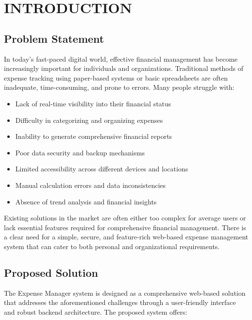 \chapter{INTRODUCTION}

\section{Problem Statement}

In today's fast-paced digital world, effective financial management has become increasingly important for individuals and organizations. Traditional methods of expense tracking using paper-based systems or basic spreadsheets are often inadequate, time-consuming, and prone to errors. Many people struggle with:

\begin{itemize}
    \item Lack of real-time visibility into their financial status
    \item Difficulty in categorizing and organizing expenses
    \item Inability to generate comprehensive financial reports
    \item Poor data security and backup mechanisms
    \item Limited accessibility across different devices and locations
    \item Manual calculation errors and data inconsistencies
    \item Absence of trend analysis and financial insights
\end{itemize}

Existing solutions in the market are often either too complex for average users or lack essential features required for comprehensive financial management. There is a clear need for a simple, secure, and feature-rich web-based expense management system that can cater to both personal and organizational requirements.

\section{Proposed Solution}

The Expense Manager system is designed as a comprehensive web-based solution that addresses the aforementioned challenges through a user-friendly interface and robust backend architecture. The proposed system offers:

